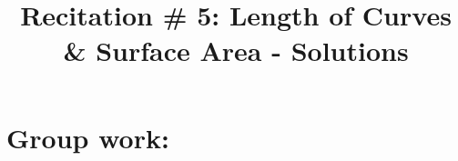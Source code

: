 \documentclass[noinstructornotes]{ximera}
\title{Recitation \# 5:  Length of Curves \& Surface Area - Solutions}
\begin{document}
\begin{abstract}		\end{abstract}
\maketitle



\begin{comment}
\section{Warm up:}

	\begin{freeResponse}
	
	\end{freeResponse}
	
\begin{instructorNotes}

\end{instructorNotes}
\end{comment}







\section{Group work:}



\end{document}
